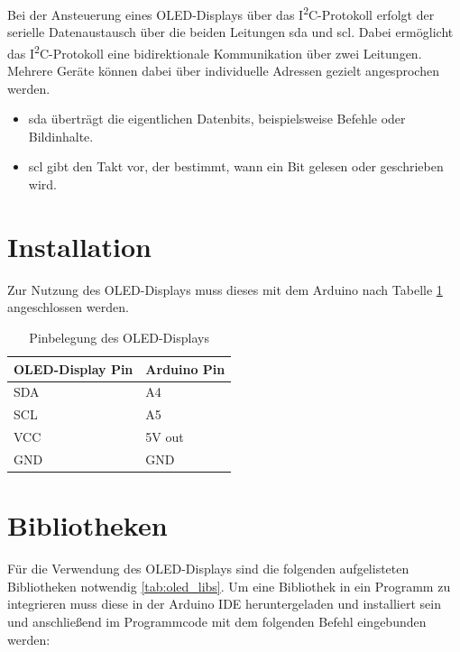 Bei der Ansteuerung eines OLED-Displays über das I\textsuperscript{2}C-Protokoll erfolgt der serielle Datenaustausch über die beiden Leitungen \ac{sda} und \ac{scl}. Dabei ermöglicht das I\textsuperscript{2}C-Protokoll eine bidirektionale Kommunikation über zwei Leitungen. Mehrere Geräte können dabei über individuelle Adressen gezielt angesprochen werden.\cite{Velleman:WPI438UserManual}

\begin{itemize}
	\item \ac{sda} überträgt die eigentlichen Datenbits, beispielsweise Befehle oder Bildinhalte.
	\item \ac{scl} gibt den Takt vor, der bestimmt, wann ein Bit gelesen oder geschrieben wird.
\end{itemize}

\section{Installation}
Zur Nutzung des OLED-Displays muss dieses mit dem Arduino nach Tabelle \ref{tab:oled_pinbelegung} angeschlossen werden.  
\begin{longtable}[h]{|p{5cm}|p{8cm}|}
	\caption{Pinbelegung des OLED-Displays}
	\label{tab:oled_pinbelegung} \\
	\hline
	\textbf{OLED-Display Pin} & \textbf{Arduino Pin} \\ \hline
	SDA & A4 \\ \hline
	SCL & A5 \\ \hline
	VCC & 5V out \\ \hline
	GND & GND \\ \hline
\end{longtable}




\section{Bibliotheken}
Für die Verwendung des OLED-Displays sind die folgenden aufgelisteten Bibliotheken notwendig \ref{tab:oled_libs}. Um eine Bibliothek in ein Programm zu integrieren muss diese in der Arduino IDE heruntergeladen und installiert sein und anschließend im Programmcode mit dem folgenden Befehl eingebunden werden:  \newline



